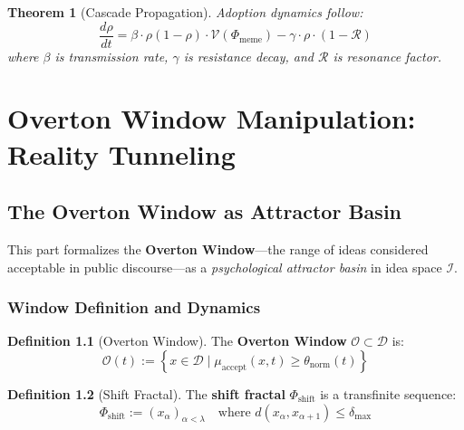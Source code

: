 \documentclass[11pt,twoside]{book}
\newcommand{\Ideas}{\mathcal{I}}
\newcommand{\Frac}{\Phi}
\newcommand{\Overton}{\mathcal{O}}
\theoremstyle{definition}
\newtheorem{definition}{Definition}[chapter]
\theoremstyle{plain}
\newtheorem{theorem}[definition]{Theorem}
\theoremstyle{remark}
\begin{document}
\begin{theorem}[Cascade Propagation]
Adoption dynamics follow:
\begin{equation}
\boxed{
    \frac{d\rho}{dt} = \beta \cdot \rho(1 - \rho) \cdot \mathcal{V}(\Frac_{\mathrm{meme}})
    - \gamma \cdot \rho \cdot (1 - \mathcal{R})
}
\end{equation}
where $\beta$ is transmission rate, $\gamma$ is resistance decay, and $\mathcal{R}$ is resonance factor.
\end{theorem}

\part{Overton Window Manipulation: Reality Tunneling}

\chapter{The Overton Window as Attractor Basin}
\label{ch:overton-window}

\begin{tcolorbox}[colback=blue!5!white,colframe=blue!75!black,title=\textbf{Chapter Overview},breakable]
This part formalizes the \textbf{Overton Window}---the range of ideas considered acceptable in public discourse---as a \textit{psychological attractor basin} in idea space $\Ideas$.
\end{tcolorbox}

\section{Window Definition and Dynamics}

\begin{definition}[Overton Window]
The \textbf{Overton Window} $\Overton \subset \mathcal{D}$ is:
\begin{equation}
\boxed{
    \Overton(t) := \left\{ x \in \mathcal{D} \;\Big|\;
    \mu_{\mathrm{accept}}(x, t) \geq \theta_{\mathrm{norm}}(t) \right\}
}
\end{equation}
\end{definition}

\begin{definition}[Shift Fractal]
The \textbf{shift fractal} $\Frac_{\mathrm{shift}}$ is a transfinite sequence:
\begin{equation}
\boxed{
    \Frac_{\mathrm{shift}} := \left( x_\alpha \right)_{\alpha < \lambda}
    \quad \text{where } d(x_\alpha, x_{\alpha+1}) \leq \delta_{\max}
}
\end{equation}
\end{definition}
\end{document}
